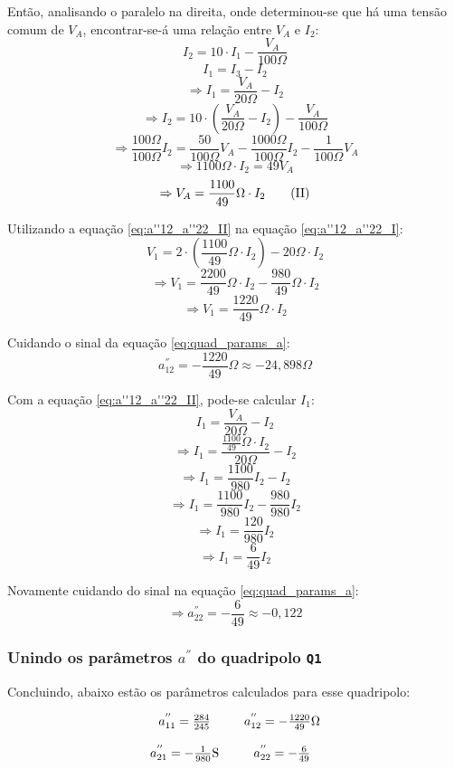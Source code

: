 \documentclass{report}
\begin{document}
Então, analisando o paralelo na direita, onde determinou-se que há uma tensão comum de $ V_A $, encontrar-se-á uma relação entre $ V_A $ e $ I_2 $:
$$ I_2 = 10 \cdot I_1 - \frac{V_A}{100\Omega} $$
$$ I_1 = I_3 - I_2 $$
$$ \Rightarrow I_1 = \frac{V_A}{20\Omega} - I_2 $$
$$ \Rightarrow I_2 = 10 \cdot \left( \frac{V_A}{20\Omega} - I_2 \right) - \frac{V_A}{100\Omega} $$
$$ \Rightarrow \frac{100\Omega}{100\Omega}I_2 = \frac{50}{100\Omega}V_A - \frac{1000\Omega}{100\Omega}I_2 - \frac{1}{100\Omega}V_A $$
$$ \Rightarrow 1100\Omega \cdot I_2 = 49V_A $$
\begin{equation}
  \label{eq:a''12_a''22_II}
  \centering
  \Rightarrow V_A = \frac{1100}{49}\Omega \cdot I_2 \tag{II}
\end{equation}

Utilizando a equação \ref{eq:a''12_a''22_II} na equação \ref{eq:a''12_a''22_I}:
$$ V_1 = 2 \cdot \left( \frac{1100}{49}\Omega \cdot I_2 \right) - 20\Omega \cdot I_2 $$
$$ \Rightarrow V_1 = \frac{2200}{49}\Omega \cdot I_2 - \frac{980}{49}\Omega \cdot I_2 $$
$$ \Rightarrow V_1 = \frac{1220}{49}\Omega \cdot I_2 $$

Cuidando o sinal da equação \ref{eq:quad_params_a}:
$$ a^{''}_{12} = - \frac{1220}{49}\Omega \approx - 24,\!898\Omega $$

Com a equação \ref{eq:a''12_a''22_II}, pode-se calcular $ I_1 $:
$$ I_1 = \frac{V_A}{20\Omega} - I_2 $$
$$ \Rightarrow I_1 = \frac{\frac{1100}{49}\Omega \cdot I_2}{20\Omega} - I_2 $$
$$ \Rightarrow I_1 = \frac{1100}{980}I_2 - I_2 $$
$$ \Rightarrow I_1 = \frac{1100}{980}I_2 - \frac{980}{980}I_2 $$
$$ \Rightarrow I_1 = \frac{120}{980}I_2 $$
$$ \Rightarrow I_1 = \frac{6}{49}I_2 $$

Novamente cuidando do sinal na equação \ref{eq:quad_params_a}:
$$ \Rightarrow a^{''}_{22} = - \frac{6}{49} \approx - 0,\!122 $$

\subsubsection{Unindo os parâmetros $ a^{''} $ do quadripolo \texttt{Q1}}

Concluindo, abaixo estão os parâmetros calculados para esse quadripolo:

\begin{equation}
  \label{eq:quad_params_a''}
  \centering
  \begin{matrix}
    a^{''}_{11} = \frac{284}{245} & \hspace{10pt} a^{''}_{12} = - \frac{1220}{49} \Omega \\\\
    a^{''}_{21} = - \frac{1}{980}\text{S} & \hspace{10pt} a^{''}_{22} = - \frac{6}{49}
  \end{matrix}
\end{equation}
\end{document}
